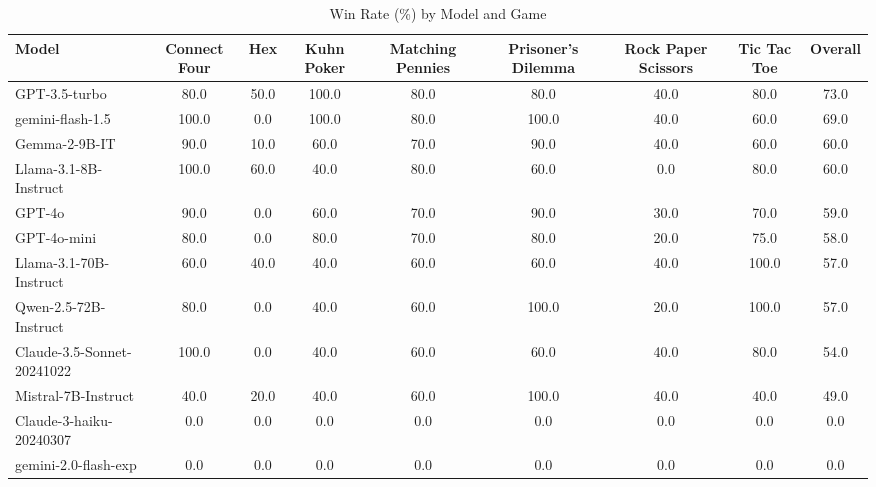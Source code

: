 \begin{table}[htbp]
\centering
\caption{Win Rate (\%) by Model and Game}
\begin{tabular}{lcccccccc}
\toprule
Model & Connect Four & Hex & Kuhn Poker & Matching Pennies & Prisoner's Dilemma & Rock Paper Scissors & Tic Tac Toe & Overall \\
\midrule
GPT-3.5-turbo & 80.0 & 50.0 & 100.0 & 80.0 & 80.0 & 40.0 & 80.0 & 73.0 \\
gemini-flash-1.5 & 100.0 & 0.0 & 100.0 & 80.0 & 100.0 & 40.0 & 60.0 & 69.0 \\
Gemma-2-9B-IT & 90.0 & 10.0 & 60.0 & 70.0 & 90.0 & 40.0 & 60.0 & 60.0 \\
Llama-3.1-8B-Instruct & 100.0 & 60.0 & 40.0 & 80.0 & 60.0 & 0.0 & 80.0 & 60.0 \\
GPT-4o & 90.0 & 0.0 & 60.0 & 70.0 & 90.0 & 30.0 & 70.0 & 59.0 \\
GPT-4o-mini & 80.0 & 0.0 & 80.0 & 70.0 & 80.0 & 20.0 & 75.0 & 58.0 \\
Llama-3.1-70B-Instruct & 60.0 & 40.0 & 40.0 & 60.0 & 60.0 & 40.0 & 100.0 & 57.0 \\
Qwen-2.5-72B-Instruct & 80.0 & 0.0 & 40.0 & 60.0 & 100.0 & 20.0 & 100.0 & 57.0 \\
Claude-3.5-Sonnet-20241022 & 100.0 & 0.0 & 40.0 & 60.0 & 60.0 & 40.0 & 80.0 & 54.0 \\
Mistral-7B-Instruct & 40.0 & 20.0 & 40.0 & 60.0 & 100.0 & 40.0 & 40.0 & 49.0 \\
Claude-3-haiku-20240307 & 0.0 & 0.0 & 0.0 & 0.0 & 0.0 & 0.0 & 0.0 & 0.0 \\
gemini-2.0-flash-exp & 0.0 & 0.0 & 0.0 & 0.0 & 0.0 & 0.0 & 0.0 & 0.0 \\
\bottomrule
\end{tabular}
\end{table}
